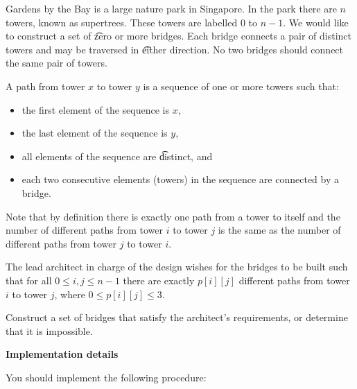 Gardens by the Bay is a large nature park in Singapore. In the park there are $n$ towers, known as supertrees. These towers are labelled $0$ to $n - 1$. We would like to construct a set of \t{zero or more} bridges. Each bridge connects a pair of distinct towers and may be traversed in \t{either} direction. No two bridges should connect the same pair of towers.

A path from tower $x$ to tower $y$ is a sequence of one or more towers such that:

\begin{itemize}
\item the first element of the sequence is $x$,
\item the last element of the sequence is $y$,
\item all elements of the sequence are \t{distinct}, and
\item each two consecutive elements (towers) in the sequence are connected by a bridge.
\end{itemize}

Note that by definition there is exactly one path from a tower to itself and the number of different paths from tower $i$ to tower $j$ is the same as the number of different paths from tower $j$ to tower $i$.

The lead architect in charge of the design wishes for the bridges to be built such that for all $0 \leq i, j \leq n-1$ there are exactly $p[i][j]$ different paths from tower $i$ to tower $j$, where $0 \leq p[i][j] \leq 3$.

Construct a set of bridges that satisfy the architect's requirements, or determine that it is impossible.

\textbf{Implementation details}

You should implement the following procedure:

